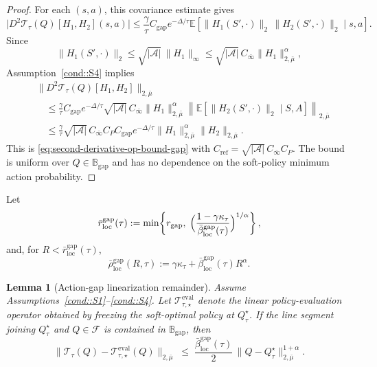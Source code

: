 \documentclass{article}
\newcommand{\loc}{\mathrm{loc}}
\theoremstyle{plain}
\newtheorem{lemma}{Lemma}
\theoremstyle{definition}
\theoremstyle{remark}
\newcommand{\E}{\mathbb{E}}
\begin{document}
\begin{proof}
For each $(s,a)$, this covariance estimate gives
\[
\bigl|D^2\mathcal T_\tau(Q)[H_1,H_2](s,a)\bigr|
\le
\frac{\gamma}{\tau}C_{\mathrm{gap}}e^{-\Delta/\tau}
\E\!\left[
\|H_1(S',\cdot)\|_2\,\|H_2(S',\cdot)\|_2
\mid s,a
\right].
\]
Since
\[
\|H_1(S',\cdot)\|_2
\le
\sqrt{|\mathcal A|}\,\|H_1\|_\infty
\le
\sqrt{|\mathcal A|}\,C_{\bar\infty}
\|H_1\|_{2,\bar\mu}^{\alpha},
\]
Assumption~\ref{cond::S4} implies
\begin{align*}
&\bigl\|D^2\mathcal T_\tau(Q)[H_1,H_2]\bigr\|_{2,\bar\mu}\\
&\quad\le
\frac{\gamma}{\tau}C_{\mathrm{gap}}e^{-\Delta/\tau}
\sqrt{|\mathcal A|}\,C_{\bar\infty}
\|H_1\|_{2,\bar\mu}^{\alpha}
\left\|\E\!\left[\|H_2(S',\cdot)\|_2\mid S,A\right]\right\|_{2,\bar\mu}\\
&\quad\le
\frac{\gamma}{\tau}
\sqrt{|\mathcal A|}\,C_{\bar\infty}C_P C_{\mathrm{gap}}
e^{-\Delta/\tau}
\|H_1\|_{2,\bar\mu}^{\alpha}
\|H_2\|_{2,\bar\mu}.
\end{align*}
This is \eqref{eq:second-derivative-op-bound-gap} with
$C_{\mathrm{ref}}=\sqrt{|\mathcal A|}\,C_{\bar\infty}C_P$. The bound is uniform
over $Q\in\mathbb B_{\mathrm{gap}}$ and has no dependence on the soft-policy
minimum action probability.
\end{proof}

Let
\begin{equation}
\label{eq:gap-radii}
\bar r_{\mathrm{loc}}^{\mathrm{gap}}(\tau)
:=
\min\!\left\{
  r_{\mathrm{gap}},\;
  \Bigl(\frac{1-\gamma\kappa_\tau}
  {\bar\beta_{\loc}^{\mathrm{gap}}(\tau)}\Bigr)^{1/\alpha}
\right\},
\end{equation}
and, for \(R<\bar r_{\mathrm{loc}}^{\mathrm{gap}}(\tau)\),
\begin{equation}
\label{eq:gap-local-rate}
\bar\rho_{\mathrm{loc}}^{\mathrm{gap}}(R,\tau)
:=
\gamma\kappa_\tau
+
\bar\beta_{\loc}^{\mathrm{gap}}(\tau)
R^\alpha.
\end{equation}

\begin{lemma}[Action-gap linearization remainder]
\label{lem:gap-linearization}
Assume Assumptions~\ref{cond::S1}--\ref{cond::S4}. Let
$\mathcal T^{\mathrm{eval}}_{\tau,\star}$ denote the linear policy-evaluation
operator obtained by freezing the soft-optimal policy at $Q^\star_\tau$. If the
line segment joining $Q^\star_\tau$ and $Q\in\mathcal F$ is contained in
$\mathbb B_{\mathrm{gap}}$, then
\[
\bigl\|
\mathcal T_\tau(Q)
-
\mathcal T^{\mathrm{eval}}_{\tau,\star}(Q)
\bigr\|_{2,\bar\mu}
\;\le\;
\frac{\bar\beta_{\loc}^{\mathrm{gap}}(\tau)}{2}\,
\|Q-Q^\star_\tau\|_{2,\bar\mu}^{1+\alpha}.
\]
\end{lemma}
\end{document}
